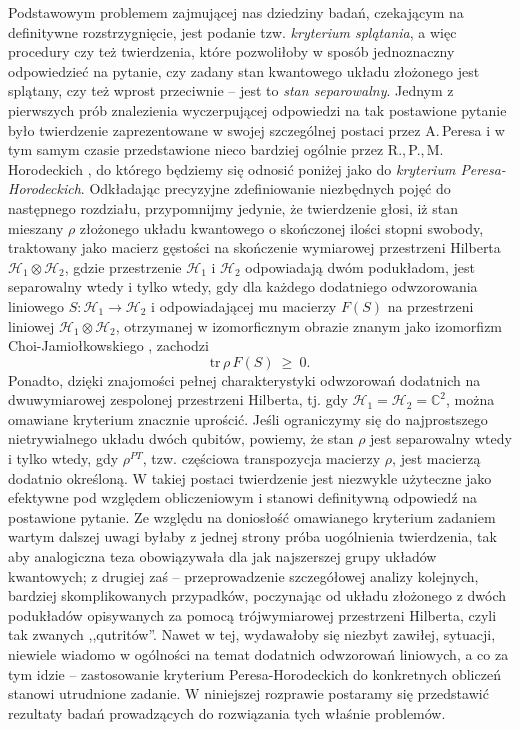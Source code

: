 Podstawowym problemem zajmującej nas dziedziny badań,
czekającym na definitywne rozstrzygnięcie,
jest podanie tzw. \emph{kryterium splątania},
a więc procedury czy też twierdzenia,
które pozwoliłoby w sposób jednoznaczny odpowiedzieć na pytanie,
czy zadany stan kwantowego układu złożonego jest splątany,
czy też wprost przeciwnie -- jest to
 \emph{stan separowalny}.
Jednym z pierwszych prób znalezienia wyczerpującej odpowiedzi na tak postawione
pytanie było twierdzenie zaprezentowane w swojej szczególnej postaci
przez A.\,Peresa
\cite{peres1996separability}
i w tym samym czasie przedstawione nieco bardziej ogólnie przez
R.,\,P.,\,M.\,Horodeckich
\cite{horodecki1996separability},
do którego będziemy się odnosić poniżej jako do
 \emph{kryterium Peresa-Horodeckich}.
Odkładając precyzyjne zdefiniowanie niezbędnych pojęć do następnego rozdziału,
przypomnijmy jedynie, że twierdzenie głosi,
iż stan mieszany $\rho$ złożonego układu kwantowego o skończonej ilości
stopni swobody,
traktowany jako macierz gęstości na skończenie wymiarowej przestrzeni
Hilberta $\mathcal{H}_{1} \otimes \mathcal{H}_{2}$,
gdzie przestrzenie $\mathcal{H}_{1}$ i $\mathcal{H}_{2}$ odpowiadają dwóm podukładom,
jest separowalny wtedy i tylko wtedy,
gdy dla każdego dodatniego odwzorowania liniowego
$S \!: \mathcal{H}_{1} \rightarrow \mathcal{H}_{2}$
i odpowiadającej mu macierzy $F(S)$ na przestrzeni liniowej
$\mathcal{H}_{1} \otimes \mathcal{H}_{2}$,
otrzymanej w izomorficznym obrazie znanym jako izomorfizm Choi-Jamiołkowskiego
\cite{choi1975completely, jamiolkowski1972linear},
zachodzi
\begin{equation}
    \nonumber
    \label{eq:PHcriterionOrig}
    \text{tr} \, \rho \, F(S) \: \geq \: 0.
\end{equation}
Ponadto, dzięki znajomości pełnej charakterystyki odwzorowań dodatnich
na dwuwymiarowej zespolonej przestrzeni Hilberta,
tj. gdy $\mathcal{H}_{1} = \mathcal{H}_{2} = \mathbb{C}^{2}$,
można omawiane kryterium znacznie uprościć.
Jeśli ograniczymy się do najprostszego nietrywialnego układu dwóch qubitów,
powiemy,
że stan $\rho$ jest separowalny wtedy i tylko wtedy,
gdy $\rho^{PT}$, tzw. częściowa transpozycja macierzy $\rho$,
jest macierzą dodatnio określoną.
W takiej postaci twierdzenie jest niezwykle użyteczne jako efektywne pod względem
obliczeniowym i stanowi definitywną odpowiedź na postawione pytanie.
Ze względu na doniosłość omawianego kryterium zadaniem wartym dalszej uwagi
byłaby z jednej strony próba uogólnienia twierdzenia,
tak aby analogiczna teza obowiązywała dla jak najszerszej grupy układów kwantowych;
z drugiej zaś -- przeprowadzenie szczegółowej analizy kolejnych,
bardziej skomplikowanych przypadków,
poczynając od układu złożonego z dwóch podukładów
opisywanych za pomocą trójwymiarowej przestrzeni Hilberta,
czyli tak zwanych ,,qutritów''.
Nawet w tej,
wydawałoby się niezbyt zawiłej,
sytuacji,
niewiele wiadomo w ogólności na temat dodatnich odwzorowań liniowych,
a co za tym idzie --
zastosowanie kryterium Peresa-Horodeckich do konkretnych obliczeń stanowi utrudnione zadanie.
W niniejszej rozprawie postaramy się przedstawić rezultaty badań prowadzących
do rozwiązania tych właśnie problemów.

